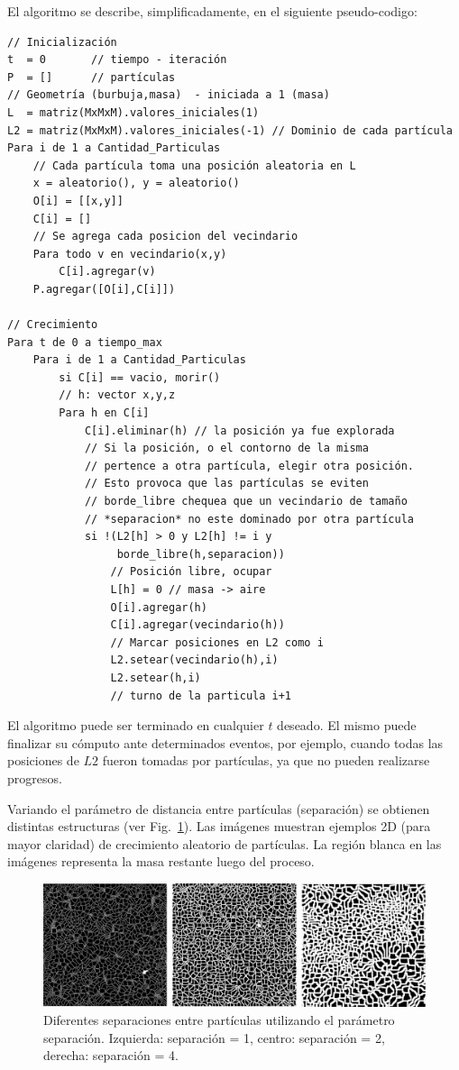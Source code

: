 \documentclass[oneside,a4paper,spanish,links]{amca}
\begin{document}
El algoritmo se describe, simplificadamente, en el siguiente pseudo-codigo: 

\begin{verbatim}
// Inicialización
t  = 0       // tiempo - iteración
P  = []      // partículas
// Geometría (burbuja,masa)  - iniciada a 1 (masa)
L  = matriz(MxMxM).valores_iniciales(1)  
L2 = matriz(MxMxM).valores_iniciales(-1) // Dominio de cada partícula
Para i de 1 a Cantidad_Particulas
    // Cada partícula toma una posición aleatoria en L
    x = aleatorio(), y = aleatorio()
    O[i] = [[x,y]]
    C[i] = []
    // Se agrega cada posicion del vecindario
    Para todo v en vecindario(x,y)
        C[i].agregar(v)
    P.agregar([O[i],C[i]])

// Crecimiento
Para t de 0 a tiempo_max
    Para i de 1 a Cantidad_Particulas
        si C[i] == vacio, morir()
        // h: vector x,y,z
        Para h en C[i]
            C[i].eliminar(h) // la posición ya fue explorada
            // Si la posición, o el contorno de la misma
            // pertence a otra partícula, elegir otra posición.
            // Esto provoca que las partículas se eviten
            // borde_libre chequea que un vecindario de tamaño
            // *separacion* no este dominado por otra partícula
            si !(L2[h] > 0 y L2[h] != i y
                 borde_libre(h,separacion))
                // Posición libre, ocupar
                L[h] = 0 // masa -> aire
                O[i].agregar(h)
                C[i].agregar(vecindario(h))
                // Marcar posiciones en L2 como i
                L2.setear(vecindario(h),i)
                L2.setear(h,i)
                // turno de la particula i+1
\end{verbatim} 


El algoritmo puede ser terminado en cualquier $t$ deseado. El mismo puede finalizar su c\'omputo ante determinados eventos, por ejemplo, cuando todas las posiciones de $L2$ fueron tomadas por part\'iculas, ya que no pueden realizarse progresos.

Variando el par\'ametro de distancia entre part\'iculas (separación) se obtienen distintas estructuras (ver Fig.~\ref{fg:fig1}). Las im\'agenes muestran ejemplos 2D (para mayor claridad) de crecimiento aleatorio de part\'iculas. La regi\'on blanca en las im\'agenes representa la masa restante luego del proceso.


\begin{figure}[htb!]
  \centerline{\includegraphics[scale=0.22]{fig1.pdf}}
  \caption{Diferentes separaciones entre part\'iculas utilizando el par\'ametro separación. Izquierda: separaci\'on = 1, centro: separaci\'on = 2, derecha: separaci\'on = 4.}
  \label{fg:fig1}
\end{figure}
\end{document}
